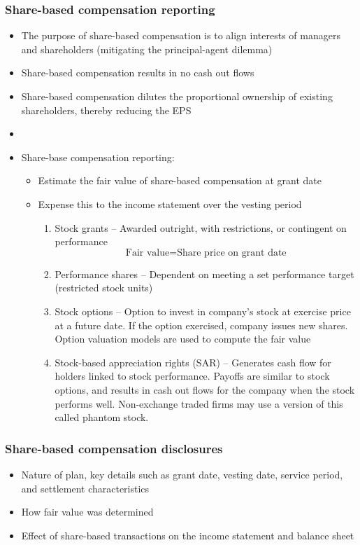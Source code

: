 \documentclass[../notes_compiled.tex]{subfiles}
\begin{document}
\subsubsection{Share-based compensation reporting}
\begin{itemize}
\item The purpose of share-based compensation is to align interests of managers and shareholders (mitigating the principal-agent dilemma)
\item Share-based compensation results in no cash out flows
\item Share-based compensation dilutes the proportional ownership of existing shareholders, thereby reducing the EPS
\item[]
\item Share-base compensation reporting:
\begin{itemize}
\item Estimate the fair value of share-based compensation at grant date
\item Expense this to the income statement over the vesting period
\begin{enumerate}
\item Stock grants -- Awarded outright, with restrictions, or contingent on performance
\begin{equation*}
\text{Fair value} = \text{Share price on grant date}
\end{equation*}
\item Performance shares -- Dependent on meeting a set performance target (restricted stock units)
\item Stock options -- Option to invest in company's stock at exercise price at a future date. If the option exercised, company issues new shares. Option valuation models are used to compute the fair value
\item Stock-based appreciation rights (SAR) -- Generates cash flow for holders linked to stock performance. Payoffs are similar to stock options, and results in cash out flows for the company when the stock performs well. Non-exchange traded firms may use a version of this called phantom stock.
\end{enumerate}
\end{itemize}
\end{itemize}

\subsubsection{Share-based compensation disclosures}
\begin{itemize}
\item Nature of plan, key details such as grant date, vesting date, service period, and settlement characteristics
\item How fair value was determined
\item Effect of share-based transactions on the income statement and balance sheet
\end{itemize}
\end{document}
